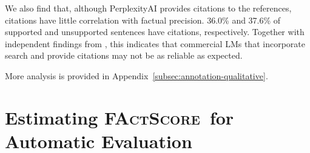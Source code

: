 \documentclass[11pt]{article}
\newcommand{\ours}{\textsc{FActScore}}
\newcommand{\hanna}[1]{\textcolor{red}{[Hanna: #1]}
}
\begin{document}
\noindent
We also find that, although PerplexityAI provides citations to the references, citations have little correlation with factual precision. 36.0\% and 37.6\% of supported and unsupported sentences have citations, respectively. %
Together with independent findings from \citet{liu2023evaluating}, %
this indicates that commercial LMs that incorporate search and provide citations may not be as reliable as expected.

\vspace{.2em}
More analysis is provided in Appendix~\ref{subsec:annotation-qualitative}.

\section{Estimating \ours\ for Automatic Evaluation}\label{sec:method}

\newcommand{\myO}{$+$}
\newcommand{\myU}{$-$}
\newcommand{\strongO}{\myO}
\newcommand{\strongU}{\myU}
\end{document}
